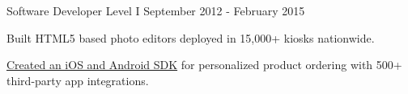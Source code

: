 \begin{cventries}
  \cventry
    {Software Developer Level I} %
    { } %
    { } %
    {September 2012 - February 2015} %
    {
      \begin{cvitems} %
      \item{Built HTML5 based photo editors deployed in 15,000+ kiosks nationwide.}
    \item{\href{https://www.fujifilmapi.com}{Created an iOS and Android SDK} for personalized product ordering with 500+ third-party app integrations.}
      \end{cvitems}
    }



\end{cventries}
